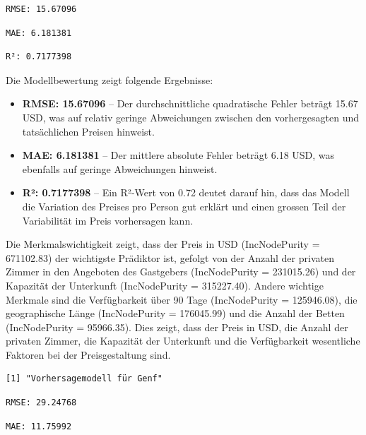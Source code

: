 \documentclass[
  journal,
]{IEEEtran}%
\begin{document}
\begin{verbatim}
RMSE: 15.67096 
\end{verbatim}

\begin{verbatim}
MAE: 6.181381 
\end{verbatim}

\begin{verbatim}
R²: 0.7177398 
\end{verbatim}

Die Modellbewertung zeigt folgende Ergebnisse:

\begin{itemize}
\item
  \textbf{RMSE: 15.67096} -- Der durchschnittliche quadratische Fehler
  beträgt 15.67 USD, was auf relativ geringe Abweichungen zwischen den
  vorhergesagten und tatsächlichen Preisen hinweist.
\item
  \textbf{MAE: 6.181381} -- Der mittlere absolute Fehler beträgt 6.18
  USD, was ebenfalls auf geringe Abweichungen hinweist.
\item
  \textbf{R²: 0.7177398} -- Ein R²-Wert von 0.72 deutet darauf hin, dass
  das Modell die Variation des Preises pro Person gut erklärt und einen
  grossen Teil der Variabilität im Preis vorhersagen kann.
\end{itemize}

Die Merkmalswichtigkeit zeigt, dass der Preis in USD (IncNodePurity =
671102.83) der wichtigste Prädiktor ist, gefolgt von der Anzahl der
privaten Zimmer in den Angeboten des Gastgebers (IncNodePurity =
231015.26) und der Kapazität der Unterkunft (IncNodePurity = 315227.40).
Andere wichtige Merkmale sind die Verfügbarkeit über 90 Tage
(IncNodePurity = 125946.08), die geographische Länge (IncNodePurity =
176045.99) und die Anzahl der Betten (IncNodePurity = 95966.35). Dies
zeigt, dass der Preis in USD, die Anzahl der privaten Zimmer, die
Kapazität der Unterkunft und die Verfügbarkeit wesentliche Faktoren bei
der Preisgestaltung sind.

\begin{verbatim}
[1] "Vorhersagemodell für Genf"
\end{verbatim}

\begin{verbatim}
RMSE: 29.24768 
\end{verbatim}

\begin{verbatim}
MAE: 11.75992 
\end{verbatim}
\end{document}
